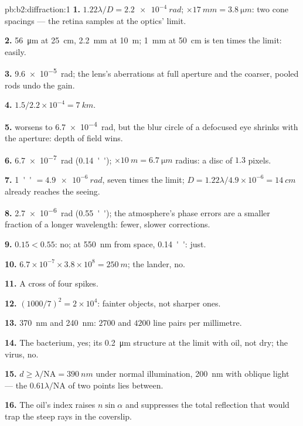 \begin{solution}{pb:b2:diffraction:1}
\textbf{1.} $1.22\lambda/D = \qty{2.2e-4}{rad}$; $\times\qty{17}{mm} = \qty{3.8}{\micro m}$: two cone
spacings --- the retina samples at the optics' limit.

\textbf{2.} \qty{56}{\micro m} at \qty{25}{cm}, \qty{2.2}{mm} at \qty{10}{m}; \qty{1}{mm} at
\qty{50}{cm} is ten times the limit: easily.

\textbf{3.} \qty{9.6e-5}{rad}; the lens's aberrations at full aperture and the
coarser, pooled rods undo the gain.

\textbf{4.} $1.5/2.2 \times 10^{-4} = \qty{7}{km}$.

\textbf{5.}  worsens to \qty{6.7e-4}{rad}, but the blur circle of
a defocused eye shrinks with the aperture: depth of field wins.

\textbf{6.} \qty{6.7e-7}{rad} (\qty{0.14}{''}); $\times\qty{10}{m} = \qty{6.7}{\micro m}$ radius: a
disc of $1.3$ pixels.

\textbf{7.} \qty{1}{''} $= \qty{4.9e-6}{rad}$, seven times the limit; $D = 1.22\lambda/4.9
\times 10^{-6} = \qty{14}{cm}$ already reaches the seeing.

\textbf{8.} \qty{2.7e-6}{rad} (\qty{0.55}{''}); the atmosphere's phase errors are
a smaller fraction of a longer wavelength: fewer, slower corrections.

\textbf{9.} $0.15 < 0.55$: no; at \qty{550}{nm} from space, \qty{0.14}{''}: just.

\textbf{10.} $6.7 \times 10^{-7} \times 3.8 \times 10^8 = \qty{250}{m}$; the lander, no.

\textbf{11.} A cross of four  spikes.

\textbf{12.} $(1000/7)^2 = 2 \times 10^4$: fainter objects, not sharper ones.

\textbf{13.} \qty{370}{nm} and \qty{240}{nm}: $2700$ and $4200$ line pairs per
millimetre.

\textbf{14.} The bacterium, yes; its \qty{0.2}{\micro m} structure at the limit
with oil, not dry; the virus, no.

\textbf{15.} $d \ge \lambda/\mathrm{NA} = \qty{390}{nm}$ under normal illumination, \qty{200}{nm}
with oblique light --- the $0.61\lambda/\mathrm{NA}$ of two points lies between.

\textbf{16.} The oil's index raises $n\sin\alpha$ and suppresses the total
reflection that would trap the steep rays in the coverslip.


\end{solution}
